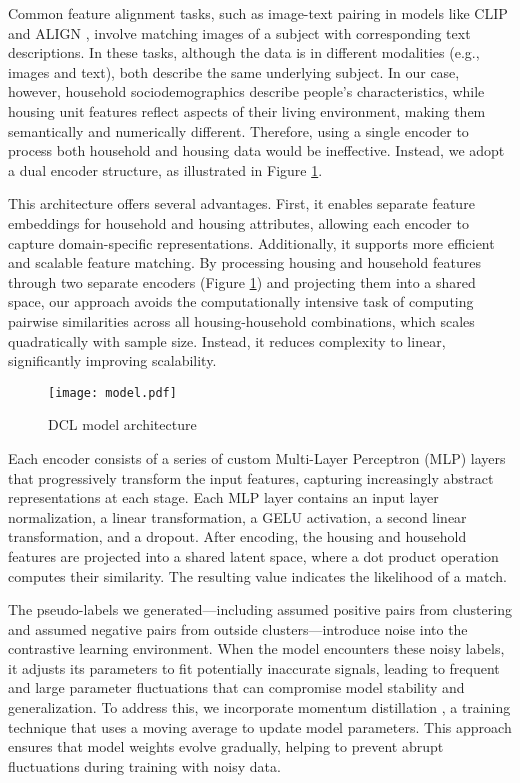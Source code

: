 \documentclass[]{nature_mod}
\begin{document}
Common feature alignment tasks, such as image-text pairing in models like CLIP \cite{radford2021learning} and ALIGN \cite{jia2021scaling}, involve matching images of a subject with corresponding text descriptions. In these tasks, although the data is in different modalities (e.g., images and text), both describe the same underlying subject. In our case, however, household sociodemographics describe people’s characteristics, while housing unit features reflect aspects of their living environment, making them semantically and numerically different. Therefore, using a single encoder to process both household and housing data would be ineffective. Instead, we adopt a dual encoder structure, as illustrated in Figure \ref{fig:DL_constrastive_model}. 

This architecture offers several advantages. First, it enables separate feature embeddings for household and housing attributes, allowing each encoder to capture domain-specific representations. Additionally, it supports more efficient and scalable feature matching. By processing housing and household features through two separate encoders (Figure \ref{fig:DL_constrastive_model}) and projecting them into a shared space, our approach avoids the computationally intensive task of computing pairwise similarities across all housing-household combinations, which scales quadratically with sample size. Instead, it reduces complexity to linear, significantly improving scalability.

\begin{figure}[!ht]
  \centering
  \texttt{[image: model.pdf]}
  \caption{DCL model architecture}
  \label{fig:DL_constrastive_model}
\end{figure}

Each encoder consists of a series of custom Multi-Layer Perceptron (MLP) layers that progressively transform the input features, capturing increasingly abstract representations at each stage. Each MLP layer contains an input layer normalization, a linear transformation, a GELU activation, a second linear transformation, and a dropout. After encoding, the housing and household features are projected into a shared latent space, where a dot product operation computes their similarity. The resulting value indicates the likelihood of a match.

The pseudo-labels we generated—including assumed positive pairs from clustering and assumed negative pairs from outside clusters—introduce noise into the contrastive learning environment. When the model encounters these noisy labels, it adjusts its parameters to fit potentially inaccurate signals, leading to frequent and large parameter fluctuations that can compromise model stability and generalization. To address this, we incorporate momentum distillation \cite{chen2020simple, li2021align}, a training technique that uses a moving average to update model parameters. This approach ensures that model weights evolve gradually, helping to prevent abrupt fluctuations during training with noisy data.
\end{document}
